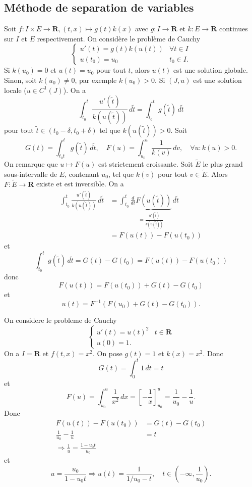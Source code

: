\subsection{Méthode de separation de variables}
Soit $f:I\times E \to \mathbf{R}, (t,x)\mapsto g(t)k(x)$ avec $g:I\to \mathbf{R}$ et $k:E\to \mathbf{R}$ continues sur $I$ et $E$ respectivement. On considère le problème de Cauchy
$$
\begin{cases}
u'(t)=g(t)k(u(t)) & \forall t\in I \\
u(t_{0})=u_{0} & t_{0}\in I.
\end{cases}
$$
Si $k(u_{0})=0$ et $u(t)=u_{0}$ pour tout $t$, alors $u(t)$ est une solution globale. Sinon, soit $k(u_{0})\neq 0$, par exemple $k(u_{0})>0$. Si $(J,u)$ est une solution locale ($u\in C^{1}(J)$). On a $$\int _{t_{0}}^{t}\frac{u'(\tilde{t})}{k(u(\tilde{t}))}\, d\tilde{t}=\int _{t_{0}}^{t}g(\tilde{t})\,d\tilde{t}$$ pour tout $\tilde{t}\in(t_{0}-\delta,t_{0}+\delta)$ tel que $k(u(\tilde{t}))>0$. Soit
$$
G(t)=\int_{t_{0}t}^{t} g(\tilde{t}) \, d\tilde{t}, \quad F(u)=\int_{u_{0}}^{u} \frac{1}{k(v)} \, dv, \quad \forall u:k(u)>0. 
$$
On remarque que $u\mapsto F(u)$ est strictement croissante. Soit $\tilde{E}$ le plus grand sous-intervalle de $E$, contenant $u_{0}$, tel que $k(v)$ pour tout $v\in \tilde{E}$. Alors $F:\tilde{E}\to \mathbf{R}$ existe et est inversible. On a
\begin{align*}
\int_{t_{0}}^{t} \frac{u'(\tilde{t})}{k(u(\tilde{t}))} \, d\tilde{t} & =\int_{t_{0}}^{t}\underbrace{ \frac{d}{dt} F(u(\tilde{t}))  }_{ =\frac{u'(\tilde{t})}{k(u(\tilde{t}))} } \, d\tilde{t} \\
 & =F(u(t))-F(u(t_{0}))
\end{align*}
et
$$
\int_{t_{0}}^{t} g(\tilde{t}) \, d\tilde{t}=G(t)-G(t_{0}) =F(u(t))-F(u(t_{0}))
$$
donc
$$
F(u(t))=F(u(t_{0}))+G(t)-G(t_{0})
$$
et
$$
u(t)=F^{-1}(F(u_{0})+G(t)-G(t_{0})).
$$
\begin{example}
On considere le probleme de Cauchy
$$
\begin{cases}
u'(t)=u(t)^{2} & t\in \mathbf{R} \\
u(0)=1 .
\end{cases}
$$
On a $I=\mathbf{R}$ et $f(t,x)=x^{2}$. On pose $g(t)=1$ et $k(x)=x^{2}$. Donc
$$
G(t)=\int _{0} ^{t}1\,d\tilde{t}=t
$$
et
$$
F(u)=\int_{u_{0}}^{u} \frac{1}{x^{2}} \, dx=\left[ -\frac{1}{x} \right]_{u_{0}}^{u}=\frac{1}{u_{0}}-\frac{1}{u}. 
$$
Donc
\begin{align*}
F(u(t))-F(u(t_{0})) & =G(t)-G(t_{0}) \\
\frac{1}{u_{0}}-\frac{1}{u} & =t \\
\Rightarrow \frac{1}{u}=\frac{1-u_{0}t}{u_{0}}
\end{align*}
et
$$
u=\frac{u_{0}}{1-u_{0}t}\Rightarrow u(t)=\frac{1}{1/u_{0}-t}, \quad t\in\left( -\infty, \frac{1}{u_{0}} \right).
$$
\end{example}
